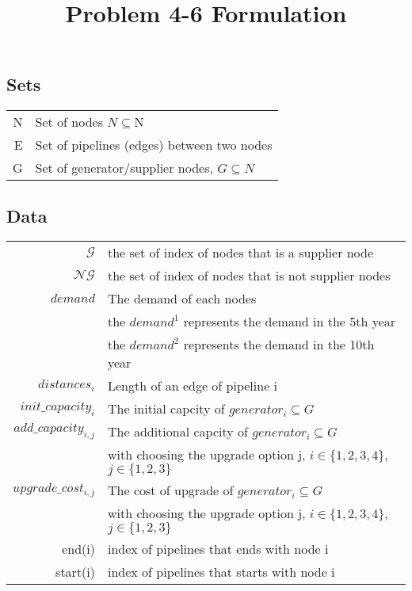 \documentclass{article}
\title{Problem 4-6 Formulation}
\begin{document}
	\maketitle
	\subsection*{Sets}
	\begin{tabular}{rl} 
		N & Set of nodes $N \subseteq $N \\
		E & Set of pipelines (edges) between two nodes  \\
		G & Set of generator/supplier nodes, $G\subseteq N$ \\

	\end{tabular}


	\subsection*{Data}
	
	\begin{tabular}{rl}
		$\mathcal{G}$ & the set of index of nodes that is a supplier node\\
		$\mathcal{NG}$ & the set of index of nodes that is not supplier nodes\\
		$demand$ & The demand of each nodes\\
		& the $demand^1$ represents the demand in the 5th year\\
		& the $demand^2$ represents the demand in the 10th year\\
		$distances_i$ & Length of an edge of pipeline i \\
		$init\_capacity_i$  & The initial capcity of $generator_i \subseteq G$  \\
		$add\_capacity_{i,j}$  & The additional capcity of $generator_i  \subseteq G$ \\
		& with choosing the upgrade option j, $i \in \{1,2,3,4\}$,$j \in \{1,2,3\}$\\
		$upgrade\_cost_{i,j}$  & The cost of upgrade of $generator_i  \subseteq G$ \\
		& with choosing the upgrade option j, $i \in \{1,2,3,4\}$,$j \in \{1,2,3\}$\\
		end(i) & index of pipelines that ends with node i\\
		start(i) & index of pipelines that starts with node i\\
	
	\end{tabular}
\end{document}
